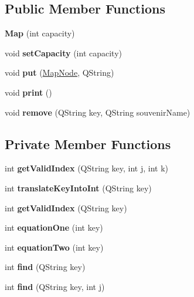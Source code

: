 \subsection*{Public Member Functions}
\begin{DoxyCompactItemize}
\item 
\mbox{\label{class_map_a74002e2be89c3eae7f045db1666933a2}} 
{\bfseries Map} (int capacity)
\item 
\mbox{\label{class_map_a34e3e168f646953aed049c0bf37fb62b}} 
void {\bfseries set\+Capacity} (int capacity)
\item 
\mbox{\label{class_map_aef091383ecb1bd251ca304eafd5c462f}} 
void {\bfseries put} (\hyperlink{class_map_node}{Map\+Node}, Q\+String)
\item 
\mbox{\label{class_map_a9c6dc88a70dcf25e3371d8bc4ec35ad0}} 
void {\bfseries print} ()
\item 
\mbox{\label{class_map_a8cfc8e8ee3a77497b8e6a2fc4cde6e5e}} 
void {\bfseries remove} (Q\+String key, Q\+String souvenir\+Name)
\end{DoxyCompactItemize}
\subsection*{Private Member Functions}
\begin{DoxyCompactItemize}
\item 
\mbox{\label{class_map_a79cd7cd192742d3c40a799c8d97692a7}} 
int {\bfseries get\+Valid\+Index} (Q\+String key, int j, int k)
\item 
\mbox{\label{class_map_a99a3d48266107311800c37510990fa09}} 
int {\bfseries translate\+Key\+Into\+Int} (Q\+String key)
\item 
\mbox{\label{class_map_adb144638ae9aa7abed9a382eb1c9176b}} 
int {\bfseries get\+Valid\+Index} (Q\+String key)
\item 
\mbox{\label{class_map_aea2092236b97fa1f8c5bce8b904f74ea}} 
int {\bfseries equation\+One} (int key)
\item 
\mbox{\label{class_map_a12437a11e54a0f03abb3625c80598eca}} 
int {\bfseries equation\+Two} (int key)
\item 
\mbox{\label{class_map_a5d72dbf2a778e81d4cf4a48a3eb2a427}} 
int {\bfseries find} (Q\+String key)
\item 
\mbox{\label{class_map_a6c3368c129c15e03cd38d5308ca919ae}} 
int {\bfseries find} (Q\+String key, int j)
\end{DoxyCompactItemize}
